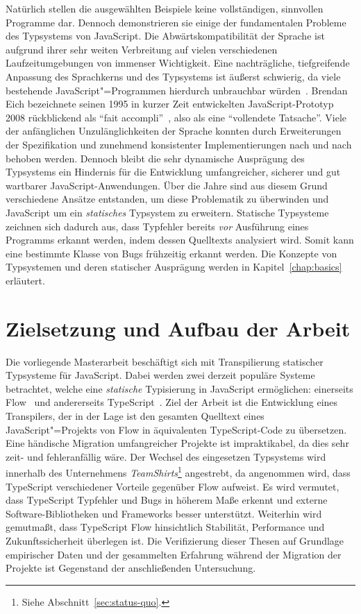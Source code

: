 Natürlich stellen die ausgewählten Beispiele keine vollständigen, sinnvollen Programme dar. Dennoch demonstrieren sie einige der fundamentalen Probleme des Typsystems von JavaScript. Die Abwärtskompatibilität der Sprache ist aufgrund ihrer sehr weiten Verbreitung auf vielen verschiedenen Laufzeitumgebungen von immenser Wichtigkeit. Eine nachträgliche, tiefgreifende Anpassung des Sprachkerns und des Typsystems ist äußerst schwierig, da viele bestehende JavaScript"=Programmen hierdurch unbrauchbar würden~\autocite[1]{CROCKFORD:JS_GOOD_PARTS}. Brendan Eich bezeichnete seinen 1995 in kurzer Zeit entwickelten JavaScript-Prototyp 2008 rückblickend als \enquote{fait accompli}~\autocite{EICH:POPULARITY}, also als eine \enquote{vollendete Tatsache}. Viele der anfänglichen Unzulänglichkeiten der Sprache konnten durch Erweiterungen der Spezifikation und zunehmend konsistenter Implementierungen nach und nach behoben werden. Dennoch bleibt die sehr dynamische Ausprägung des Typsystems ein Hindernis für die Entwicklung umfangreicher, sicherer und gut wartbarer JavaScript-Anwendungen. Über die Jahre sind aus diesem Grund verschiedene Ansätze entstanden, um diese Problematik zu überwinden und JavaScript um ein \emph{statisches} Typsystem zu erweitern. Statische Typsysteme zeichnen sich dadurch aus, dass Typfehler bereits \emph{vor} Ausführung eines Programms erkannt werden, indem dessen Quelltexts analysiert wird. Somit kann eine bestimmte Klasse von Bugs frühzeitig erkannt werden. Die Konzepte von Typsystemen und deren statischer Ausprägung werden in Kapitel~\ref{chap:basics} erläutert.

\section{Zielsetzung und Aufbau der Arbeit}

Die vorliegende Masterarbeit beschäftigt sich mit Transpilierung statischer Typsysteme für JavaScript. Dabei werden zwei derzeit populäre Systeme betrachtet, welche eine \emph{statische} Typisierung in JavaScript ermöglichen: einerseits Flow~\autocite{FLOW:PAPER} und andererseits TypeScript~\autocite{TYPESCRIPT_SPEC}. Ziel der Arbeit ist die Entwicklung eines Transpilers, der in der Lage ist den gesamten Quelltext eines JavaScript"=Projekts von Flow in äquivalenten TypeScript-Code zu übersetzen. Eine händische Migration umfangreicher Projekte ist impraktikabel, da dies sehr zeit- und fehleranfällig wäre. Der Wechsel des eingesetzen Typsystems wird innerhalb des Unternehmens \textit{TeamShirts}\footnote{Siehe Abschnitt~\ref{sec:status-quo}.} angestrebt, da angenommen wird, dass TypeScript verschiedener Vorteile gegenüber Flow aufweist. Es wird vermutet, dass TypeScript Typfehler und Bugs in höherem Maße erkennt und externe Software-Bibliotheken und Frameworks besser unterstützt. Weiterhin wird gemutmaßt, dass TypeScript Flow hinsichtlich Stabilität, Performance und Zukunftssicherheit überlegen ist. Die Verifizierung dieser Thesen auf Grundlage empirischer Daten und der gesammelten Erfahrung während der Migration der Projekte ist Gegenstand der anschließenden Untersuchung.


